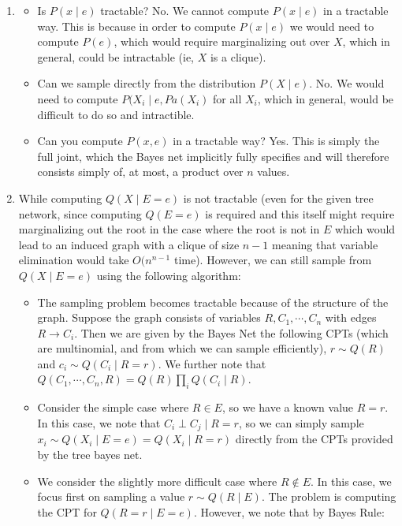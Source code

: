 \documentclass[12pt]{article}
\begin{document}
\begin{enumerate}[label=(\alph*)]
\item 
	\begin{itemize}
		\item Is $P(x\mid e)$ tractable? No. We cannot compute $P(x \mid e)$ in a tractable way. This is because in order to compute $P(x \mid e)$ we would need to compute $P(e)$, which would require marginalizing out over $X$, which in general, could be intractable (ie, $X$ is a clique).
		\item Can we sample directly from the distribution $P(X \mid e)$. No. We would need to compute $P(X_i \mid e, Pa(X_i)$ for all $X_i$, which in general, would be difficult to do so and intractible.
		\item Can you compute $P(x,e)$ in a tractable way? Yes. This is simply the full joint, which the Bayes net implicitly fully specifies and will therefore consists simply of, at most, a product over $n$ values.
	\end{itemize}
	\item While computing $Q(X \mid E = e)$ is not tractable (even for the given tree network, since computing $Q(E = e)$ is required and this itself might require marginalizing out the root in the case where the root is not in $E$ which would lead to an induced graph with a clique of size $n-1$ meaning that variable elimination would take $O(n^{n-1}$ time). However, we can still sample from $Q(X \mid E = e)$ using the following algorithm:
		\begin{itemize}
			\item The sampling problem becomes tractable because of the structure of the graph. Suppose the graph consists of variables $R, C_1, \cdots, C_n$ with edges $R \to C_i$. Then we are given by the Bayes Net the following CPTs (which are multinomial, and from which we can sample efficiently), $r \sim Q(R)$ and $c_i \sim Q(C_i \mid R = r)$. We further note that $Q(C_1, \cdots, C_n, R) = Q(R)\prod_i Q(C_i \mid R)$.
			\item Consider the simple case where $R \in E$, so we have a known value $R = r$. In this case, we note that $C_i \perp C_j \mid R = r$, so we can simply sample $x_i \sim Q(X_i \mid E = e) = Q(X_i \mid R = r)$ directly from the CPTs provided by the tree bayes net.
			\item We consider the slightly more difficult case where $R \notin E$. In this case, we focus first on sampling a value $r \sim Q(R \mid E)$. The problem is computing the CPT for $Q(R = r \mid E = e)$. However, we note that by Bayes Rule:

\end{itemize}
\end{enumerate}
\end{document}

